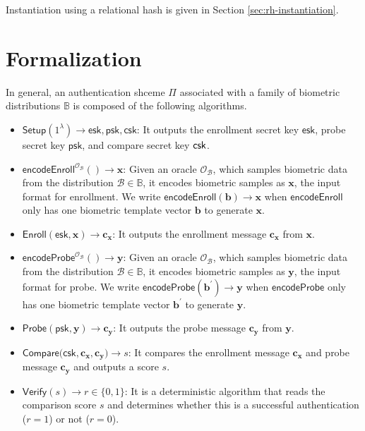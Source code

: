 Instantiation using a relational hash is given in Section \ref{sec:rh-instantiation}.




\section{Formalization}
\label{sec:formalization}


In general, an authentication shceme $\Pi$ associated with a family of biometric distributions $\mathbb{B}$ is composed of the following algorithms.

\begin{itemize}

	\item $\textsf{Setup}(1^\lambda) \to \textsf{esk}, \textsf{psk}, \textsf{csk}$: It outputs the enrollment secret key $\textsf{esk}$, probe secret key $\textsf{psk}$, and compare secret key $\sf csk$.

	\item $\textsf{encodeEnroll}^{\mathcal{O}_{\mathcal{B}}}() \to \mathbf{x}$: Given an oracle $\mathcal{O}_{\mathcal{B}}$, which samples biometric data from the distribution $\mathcal{B} \in \mathbb{B}$, it encodes biometric samples as $\mathbf{x}$, the input format for enrollment. We write $\textsf{encodeEnroll}(\mathbf{b}) \to \mathbf{x}$ when $\textsf{encodeEnroll}$ only has one biometric template vector $\mathbf{b}$ to generate $\mathbf{x}$. 

	\item $\textsf{Enroll}(\textsf{esk}, \mathbf{x}) \to \mathbf{c_x}$: It outputs the enrollment message $\mathbf{c_x}$ from $\mathbf{x}$.

	\item $\textsf{encodeProbe}^{\mathcal{O}_{\mathcal{B}}}() \to \mathbf{y}$: Given an oracle $\mathcal{O}_{\mathcal{B}}$, which samples biometric data from the distribution $\mathcal{B} \in \mathbb{B}$, it encodes biometric samples as $\mathbf{y}$, the input format for probe. We write $\textsf{encodeProbe}(\mathbf{b}^\prime) \to \mathbf{y}$ when $\textsf{encodeProbe}$ only has one biometric template vector $\mathbf{b}^\prime$ to generate $\mathbf{y}$.

	\item $\textsf{Probe}(\textsf{psk}, \mathbf{y}) \to \mathbf{c_y}$: It outputs the probe message $\mathbf{c_y}$ from $\mathbf{y}$.

	\item $\textsf{Compare}(\textsf{csk}, \mathbf{c_x}, \mathbf{c_y)} \to s$: It compares the enrollment message $\mathbf{c_x}$ and probe message $\mathbf{c_y}$ and outputs a score $s$.

	\item $\textsf{Verify}(s) \to r \in \{0,1\}$: It is a deterministic algorithm that reads the comparison score $s$ and determines whether this is a successful authentication ($r = 1$) or not ($r = 0$).

\end{itemize}

